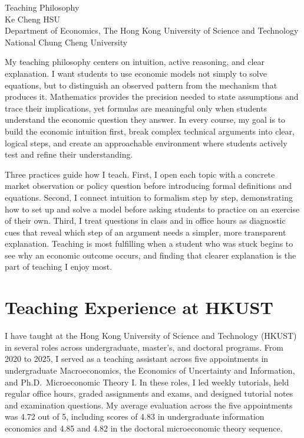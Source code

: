 \documentclass[11pt]{article}
\begin{document}
\begin{center}
{\Large Teaching Philosophy}\\[0.25em]
Ke Cheng HSU\\
{\small Department of Economics, The Hong Kong University of Science and Technology}\\
{\small National Chung Cheng University}
\end{center}

My teaching philosophy centers on intuition, active reasoning, and clear explanation. I want students to use economic models not simply to solve equations, but to distinguish an observed pattern from the mechanism that produces it. Mathematics provides the precision needed to state assumptions and trace their implications, yet formulas are meaningful only when students understand the economic question they answer. In every course, my goal is to build the economic intuition first, break complex technical arguments into clear, logical steps, and create an approachable environment where students actively test and refine their understanding.

Three practices guide how I teach. First, I open each topic with a concrete market observation or policy question before introducing formal definitions and equations. Second, I connect intuition to formalism step by step, demonstrating how to set up and solve a model before asking students to practice on an exercise of their own. Third, I treat questions in class and in office hours as diagnostic cues that reveal which step of an argument needs a simpler, more transparent explanation. Teaching is most fulfilling when a student who was stuck begins to see why an economic outcome occurs, and finding that clearer explanation is the part of teaching I enjoy most.

\section*{Teaching Experience at HKUST}

I have taught at the Hong Kong University of Science and Technology (HKUST) in several roles across undergraduate, master's, and doctoral programs. From 2020 to 2025, I served as a teaching assistant across five appointments in undergraduate Macroeconomics, the Economics of Uncertainty and Information, and Ph.D.\ Microeconomic Theory I. In these roles, I led weekly tutorials, held regular office hours, graded assignments and exams, and designed tutorial notes and examination questions. My average evaluation across the five appointments was 4.72 out of 5, including scores of 4.83 in undergraduate information economics and 4.85 and 4.82 in the doctoral microeconomic theory sequence.
\end{document}

